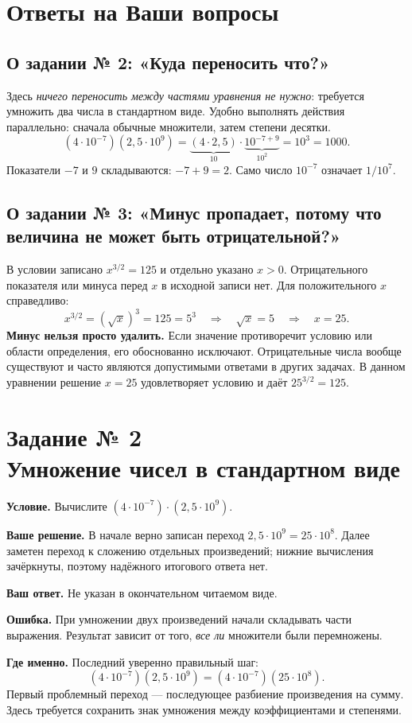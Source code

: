 \documentclass[a4paper,11pt]{article}
\newcommand{\Err}{\textcolor{errorred}{\textbf{Ошибка.}}}
\newcommand{\taskhead}[2]{\phantomsection\label{task:#1}\section*{Задание № #1\\[3pt]\large\normalfont #2}}
\begin{document}
\section*{Ответы на Ваши вопросы}
\subsection*{О задании № 2: «Куда переносить что?»}
Здесь \emph{ничего переносить между частями уравнения не нужно}: требуется умножить два числа в стандартном виде. Удобно выполнять действия параллельно: сначала обычные множители, затем степени десятки.
\[
(4\cdot10^{-7})(2{,}5\cdot10^9)
=\underbrace{(4\cdot2{,}5)}_{10}
\cdot\underbrace{10^{-7+9}}_{10^2}
=10^3=1000.
\]
Показатели $-7$ и $9$ складываются: $-7+9=2$. Само число $10^{-7}$ означает $1/10^7$.

\subsection*{О задании № 3: «Минус пропадает, потому что величина не может быть отрицательной?»}
В условии записано $x^{3/2}=125$ и отдельно указано $x>0$. Отрицательного показателя или минуса перед $x$ в исходной записи нет. Для положительного $x$ справедливо:
\[
 x^{3/2}=(\sqrt{x})^3=125=5^3
 \quad\Longrightarrow\quad\sqrt{x}=5\quad\Longrightarrow\quad x=25.
\]
\textbf{Минус нельзя просто удалить.} Если значение противоречит условию или области определения, его обоснованно исключают. Отрицательные числа вообще существуют и часто являются допустимыми ответами в других задачах. В данном уравнении решение $x=25$ удовлетворяет условию и даёт $25^{3/2}=125$.
\newpage
\taskhead{2}{Умножение чисел в стандартном виде}
\textbf{Условие.} Вычислите $(4\cdot10^{-7})\cdot(2{,}5\cdot10^9)$.

\textbf{Ваше решение.} В начале верно записан переход $2{,}5\cdot10^9=25\cdot10^8$. Далее заметен переход к сложению отдельных произведений; нижние вычисления зачёркнуты, поэтому надёжного итогового ответа нет.

\textbf{Ваш ответ.} Не указан в окончательном читаемом виде.

\Err{} При умножении двух произведений начали складывать части выражения. Результат зависит от того, \emph{все ли} множители были перемножены.

\textbf{Где именно.} Последний уверенно правильный шаг:
\[
(4\cdot10^{-7})(2{,}5\cdot10^9)
=(4\cdot10^{-7})(25\cdot10^8).
\]
Первый проблемный переход --- последующее разбиение произведения на сумму. Здесь требуется сохранить знак умножения между коэффициентами и степенями.
\end{document}

